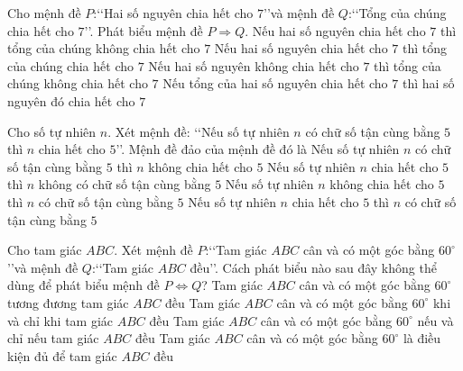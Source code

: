 \begin{ex}
	Cho mệnh đề $P$:\lq\lq Hai số nguyên chia hết cho $7$\rq\rq và mệnh đề $Q$:\lq\lq Tổng của chúng chia hết cho $7$\rq\rq. Phát biểu mệnh đề $P\Rightarrow Q$.
	\choice
	{Nếu hai số nguyên chia hết cho $7$ thì tổng của chúng không chia hết cho $7$}
	{\True Nếu hai số nguyên chia hết cho $7$ thì tổng của chúng chia hết cho $7$}
	{Nếu hai số nguyên không chia hết cho $7$ thì tổng của chúng không chia hết cho $7$}
	{Nếu tổng của hai số nguyên chia hết cho $7$ thì hai số nguyên đó chia hết cho $7$}
\end{ex}
\begin{ex}
	Cho số tự nhiên $n$. Xét mệnh đề: \lq\lq Nếu số tự nhiên $n$ có chữ số tận cùng bằng $5$ thì $n$ chia hết cho $5$\rq\rq. Mệnh đề đảo của mệnh đề đó là
	\choice
	{Nếu số tự nhiên $n$ có chữ số tận cùng bằng $5$ thì $n$ không chia hết cho $5$}
	{Nếu số tự nhiên $n$ chia hết cho $5$ thì $n$ không có chữ số tận cùng bằng $5$}
	{Nếu số tự nhiên $n$ không chia hết cho $5$ thì $n$ có chữ số tận cùng bằng $5$}
	{\True Nếu số tự nhiên $n$ chia hết cho $5$ thì $n$ có chữ số tận cùng bằng $5$}
\end{ex}
\begin{ex}
	Cho tam giác $ABC$. Xét mệnh đề $P$:\lq\lq Tam giác $ABC$ cân và có một góc bằng $60^\circ $\rq\rq và mệnh đề $Q$:\lq\lq Tam giác $ABC$ đều\rq\rq. Cách phát biểu nào sau đây không thể dùng để phát biểu mệnh đề $P\Leftrightarrow Q$?
	\choice
	{Tam giác $ABC$ cân và có một góc bằng $60^\circ $ tương đương tam giác $ABC$ đều}
	{Tam giác $ABC$ cân và có một góc bằng $60^\circ $ khi và chỉ khi tam giác $ABC$ đều}
	{Tam giác $ABC$ cân và có một góc bằng $60^\circ $ nếu và chỉ nếu tam giác $ABC$ đều}
	{\True Tam giác $ABC$ cân và có một góc bằng $60^\circ $ là điều kiện đủ để tam giác $ABC$ đều}
\end{ex}
